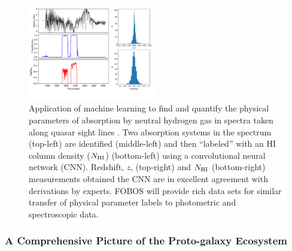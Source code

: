 \documentclass[oneside,11pt]{amsart}
\begin{document}
\begin{figure}\small
%
\includegraphics[width=0.5\textwidth]{figs/Parks_fig.pdf}
%
\caption{Application of machine learning to find and quantify the
physical parameters of absorption by neutral hydrogen gas in spectra
taken along quasar sight lines \citep[adapted from Figs 7 and 14
from][]{parks18}.  Two absorption systems in the spectrum (top-left) are
identified (middle-left) and then ``labeled'' with an HI column density
($N_{\rm HI}$) (bottom-left) using a convolutional neural network (CNN).
Redshift, $z$, (top-right) and $N_{\rm HI}$ (bottom-right) measurements
obtained the CNN are in excellent agreement with derivations by experts.
FOBOS will provide rich data sets for similar transfer of
physical parameter labels to photometric and spectroscopic data.}
%
\label{fig:absorber}
%
\end{figure}

\subsubsection{A Comprehensive Picture of the Proto-galaxy Ecosystem}
\label{sec:galaxies}

%
%
%
%
\end{document}

